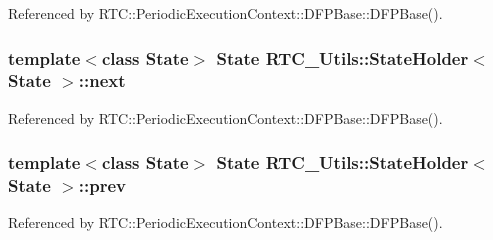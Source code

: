 Referenced by RTC::PeriodicExecutionContext::DFPBase::DFPBase().

\subsubsection[{next}]{\setlength{\rightskip}{0pt plus 5cm}template$<$class State$>$ State {\bf RTC\_\-Utils::StateHolder}$<$ State $>$::{\bf next}}\label{structRTC__Utils_1_1StateHolder_af7c8270e02be5f1575d4982115149713}


Referenced by RTC::PeriodicExecutionContext::DFPBase::DFPBase().

\subsubsection[{prev}]{\setlength{\rightskip}{0pt plus 5cm}template$<$class State$>$ State {\bf RTC\_\-Utils::StateHolder}$<$ State $>$::{\bf prev}}\label{structRTC__Utils_1_1StateHolder_a8e1e247158f889059ba84d6428a4fd35}


Referenced by RTC::PeriodicExecutionContext::DFPBase::DFPBase().

